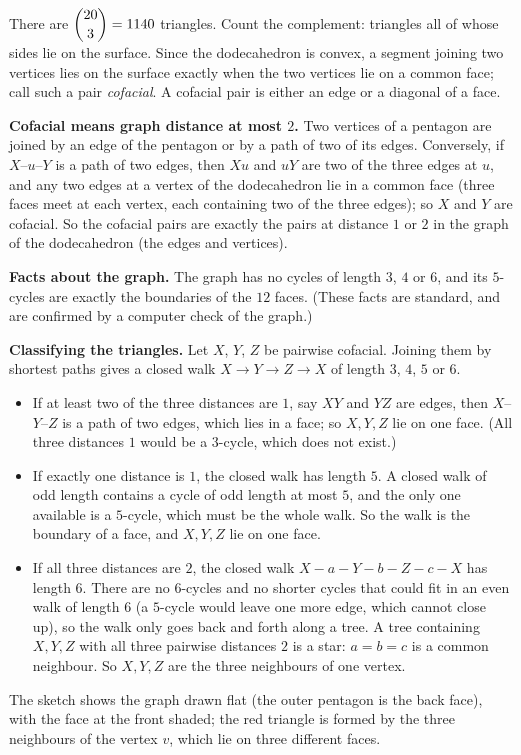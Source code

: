 There are $\dbinom{20}{3}=1140$ triangles. Count the complement: triangles all of whose sides lie on the surface. Since the dodecahedron is convex, a segment joining two vertices lies on the surface exactly when the two vertices lie on a common face; call such a pair \emph{cofacial}. A cofacial pair is either an edge or a diagonal of a face.

\textbf{Cofacial means graph distance at most $2$.} Two vertices of a pentagon are joined by an edge of the pentagon or by a path of two of its edges. Conversely, if $X$--$u$--$Y$ is a path of two edges, then $Xu$ and $uY$ are two of the three edges at $u$, and any two edges at a vertex of the dodecahedron lie in a common face (three faces meet at each vertex, each containing two of the three edges); so $X$ and $Y$ are cofacial. So the cofacial pairs are exactly the pairs at distance $1$ or $2$ in the graph of the dodecahedron (the edges and vertices).

\textbf{Facts about the graph.} The graph has no cycles of length $3$, $4$ or $6$, and its $5$-cycles are exactly the boundaries of the $12$ faces. (These facts are standard, and are confirmed by a computer check of the graph.)

\textbf{Classifying the triangles.} Let $X$, $Y$, $Z$ be pairwise cofacial. Joining them by shortest paths gives a closed walk $X\to Y\to Z\to X$ of length $3$, $4$, $5$ or $6$.
\begin{itemize}
\item If at least two of the three distances are $1$, say $XY$ and $YZ$ are edges, then $X$--$Y$--$Z$ is a path of two edges, which lies in a face; so $X,Y,Z$ lie on one face. (All three distances $1$ would be a $3$-cycle, which does not exist.)
\item If exactly one distance is $1$, the closed walk has length $5$. A closed walk of odd length contains a cycle of odd length at most $5$, and the only one available is a $5$-cycle, which must be the whole walk. So the walk is the boundary of a face, and $X,Y,Z$ lie on one face.
\item If all three distances are $2$, the closed walk $X-a-Y-b-Z-c-X$ has length $6$. There are no $6$-cycles and no shorter cycles that could fit in an even walk of length $6$ (a $5$-cycle would leave one more edge, which cannot close up), so the walk only goes back and forth along a tree. A tree containing $X,Y,Z$ with all three pairwise distances $2$ is a star: $a=b=c$ is a common neighbour. So $X,Y,Z$ are the three neighbours of one vertex.
\end{itemize}
The sketch shows the graph drawn flat (the outer pentagon is the back face), with the face at the front shaded; the red triangle is formed by the three neighbours of the vertex $v$, which lie on three different faces.

